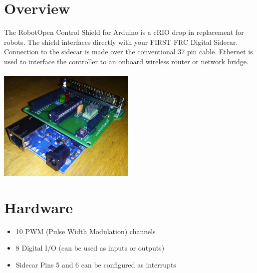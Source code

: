\documentclass{article}
\begin{document}
\pagestyle{fancy}
\fancyfoot[C]{}
\setlength\headsep{50pt}
\setlength\footskip{15pt}
\begin{multicols}{2}    %


\section*{Overview}
The RobotOpen Control Shield for Arduino is a cRIO drop in replacement for robots. The shield interfaces directly with your FIRST FRC Digital Sidecar. Connection to the sidecar is made over the conventional 37 pin cable. Ethernet is used to interface the controller to an onboard wireless router or network bridge.
\\\\
\includegraphics[width=248px]{side.jpg}

\section*{Hardware}

\begin{itemize}

\item 10 PWM (Pulse Width Modulation) channels

\item 8 Digital I/O (can be used as inputs or outputs)

\item Sidecar Pins 5 and 6 can be configured as interrupts


\end{itemize}
\end{multicols}
\end{document}
